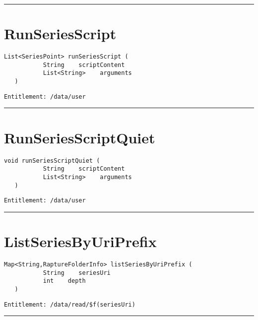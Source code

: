 \rule{12cm}{2pt}
\section{RunSeriesScript}
\label{Api:RunSeriesScript}
\begin{lstlisting}[style=nonumbers]
   List<SeriesPoint> runSeriesScript (
           String    scriptContent
           List<String>    arguments
   )
\end{lstlisting}
\begin{Verbatim}[formatcom=\color{Maroon}]
  Entitlement: /data/user
\end{Verbatim}



\rule{12cm}{2pt}
\section{RunSeriesScriptQuiet}
\label{Api:RunSeriesScriptQuiet}
\begin{lstlisting}[style=nonumbers]
   void runSeriesScriptQuiet (
           String    scriptContent
           List<String>    arguments
   )
\end{lstlisting}
\begin{Verbatim}[formatcom=\color{Maroon}]
  Entitlement: /data/user
\end{Verbatim}



\rule{12cm}{2pt}
\section{ListSeriesByUriPrefix}
\label{Api:ListSeriesByUriPrefix}
\begin{lstlisting}[style=nonumbers]
   Map<String,RaptureFolderInfo> listSeriesByUriPrefix (
           String    seriesUri
           int    depth
   )
\end{lstlisting}
\begin{Verbatim}[formatcom=\color{Maroon}]
  Entitlement: /data/read/$f(seriesUri)
\end{Verbatim}



\rule{12cm}{2pt}

